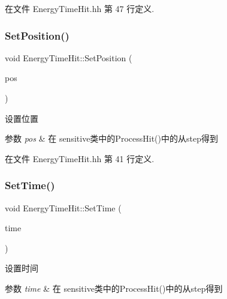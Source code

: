 在文件 Energy\+Time\+Hit.\+hh 第 47 行定义.

\mbox{\label{classEnergyTimeHit_a987123b85e019adc1f01332bb23c3f2c}} 
\subsubsection{\texorpdfstring{Set\+Position()}{SetPosition()}}
{\footnotesize\ttfamily void Energy\+Time\+Hit\+::\+Set\+Position (\begin{DoxyParamCaption}\item[{G4\+Three\+Vector}]{pos }\end{DoxyParamCaption})\hspace{0.3cm}{\ttfamily [inline]}}



设置位置 


\begin{DoxyParams}{参数}
{\em pos} & 在 sensitive类中的\+Process\+Hit()中的从step得到 \\
\hline
\end{DoxyParams}


在文件 Energy\+Time\+Hit.\+hh 第 41 行定义.

\mbox{\label{classEnergyTimeHit_a139ed317e433a0ddef477117f39daf8a}} 
\subsubsection{\texorpdfstring{Set\+Time()}{SetTime()}}
{\footnotesize\ttfamily void Energy\+Time\+Hit\+::\+Set\+Time (\begin{DoxyParamCaption}\item[{G4double}]{time }\end{DoxyParamCaption})\hspace{0.3cm}{\ttfamily [inline]}}



设置时间 


\begin{DoxyParams}{参数}
{\em time} & 在 sensitive类中的\+Process\+Hit()中的从step得到 \\
\hline
\end{DoxyParams}



